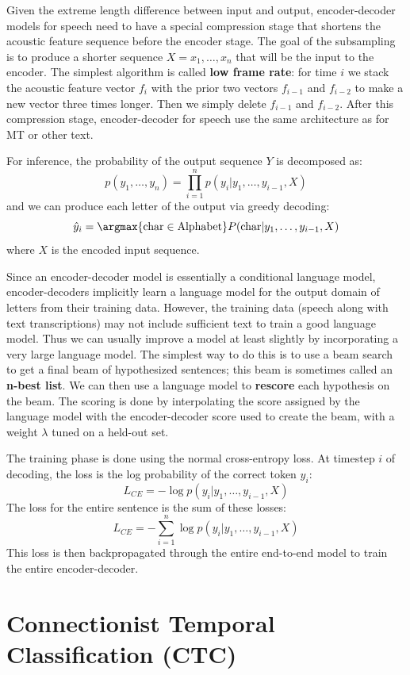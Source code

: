 Given the extreme length difference between input and output, encoder-decoder models for speech need to have a special compression stage that shortens the acoustic feature sequence before the encoder stage. The goal of the subsampling is to produce a shorter sequence $X = x_1,\dots,x_n$ that will be the input to the encoder. The simplest algorithm is called \textbf{low frame rate}: for time $i$ we stack the acoustic feature vector $f_i$ with the prior two vectors $f_{i-1}$ and $f_{i-2}$ to make a new vector three times longer. Then we simply delete $f_{i-1}$ and $f_{i-2}$. After this compression stage, encoder-decoder for speech use the same architecture as for MT or other text.

For inference, the probability of the output sequence $Y$ is decomposed as:
\[
p(y_1,\dots,y_n) = \prod_{i=1}^n p(y_i|y_1,\dots,y_{i-1},X)
\]
and we can produce each letter of the output via greedy decoding:
\[
\hat{y}_i = \argmax{\text{char}\in\text{Alphabet}} P(\text{char}|y_1,\dots,y_{i-1},X)
\]
where $X$ is the encoded input sequence.

Since an encoder-decoder model is essentially a conditional language model, encoder-decoders implicitly learn a language model for the output domain of letters from their training data. However, the training data (speech along with text transcriptions) may not include sufficient text to train a good language model. Thus we can usually improve a model at least slightly by incorporating a very large language model. 
The simplest way to do this is to use a beam search to get a final beam of hypothesized sentences; this beam is sometimes called an \textbf{n-best list}. We can then use a language model to \textbf{rescore} each hypothesis on the beam. The scoring is done by interpolating the score assigned by the language model with the encoder-decoder score used to create the beam, with a weight $\lambda$ tuned on a held-out set.

The training phase is done using the normal cross-entropy loss. At timestep $i$ of decoding, the loss is the log probability of the correct token $y_i$:
\[
L_{CE} = -\log p(y_i|y_1,\dots,y_{i-1},X)
\]
The loss for the entire sentence is the sum of these losses:
\[
L_{CE} = -\sum_{i=1}^n \log p(y_i|y_1,\dots,y_{i-1},X)
\]
This loss is then backpropagated through the entire end-to-end model to train the entire encoder-decoder. 

\section{Connectionist Temporal Classification (CTC)}

